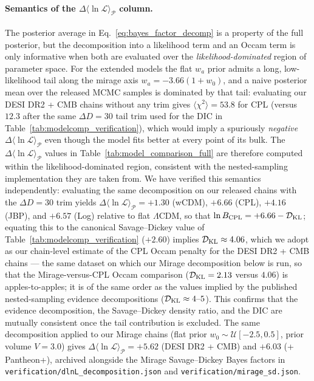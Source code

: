 \documentclass[11pt,letterpaper]{article}
\begin{document}
\paragraph{Semantics of the $\Delta \langle \ln \mathcal{L} \rangle_{\mathcal{P}}$ column.} The posterior average in Eq.~\ref{eq:bayes_factor_decomp} is a property of the full posterior, but the decomposition into a likelihood term and an Occam term is only informative when both are evaluated over the \emph{likelihood-dominated} region of parameter space. For the extended models the flat $w_a$ prior admits a long, low-likelihood tail along the mirage axis $w_a = -3.66(1+w_0)$, and a naive posterior mean over the released MCMC samples is dominated by that tail: evaluating our DESI DR2 + CMB chains without any trim gives $\langle \chi^2 \rangle = 53.8$ for CPL (versus $12.3$ after the same $\Delta D = 30$ tail trim used for the DIC in Table~\ref{tab:modelcomp_verification}), which would imply a spuriously \emph{negative} $\Delta \langle \ln \mathcal{L} \rangle_{\mathcal{P}}$ even though the model fits better at every point of its bulk. The $\Delta \langle \ln \mathcal{L} \rangle_{\mathcal{P}}$ values in Table~\ref{tab:model_comparison_full} are therefore computed within the likelihood-dominated region, consistent with the nested-sampling implementation they are taken from. We have verified this semantics independently: evaluating the same decomposition on our released chains with the $\Delta D = 30$ trim yields $\Delta \langle \ln \mathcal{L} \rangle_{\mathcal{P}} = +1.30$ (wCDM), $+6.66$ (CPL), $+4.16$ (JBP), and $+6.57$ (Log) relative to flat $\Lambda$CDM, so that $\ln B_{\rm CPL} = +6.66 - \mathcal{D}_{\rm KL}$; equating this to the canonical Savage--Dickey value of Table~\ref{tab:modelcomp_verification} ($+2.60$) implies $\mathcal{D}_{\rm KL} \approx 4.06$, which we adopt as our chain-level estimate of the CPL Occam penalty for the DESI DR2 + CMB chains --- the same dataset on which our Mirage decomposition below is run, so that the Mirage-versus-CPL Occam comparison ($\mathcal{D}_{\rm KL} = 2.13$ versus $4.06$) is apples-to-apples; it is of the same order as the values implied by the published nested-sampling evidence decompositions ($\mathcal{D}_{\rm KL} \approx 4\text{--}5$). This confirms that the evidence decomposition, the Savage--Dickey density ratio, and the DIC are mutually consistent once the tail contribution is excluded. The same decomposition applied to our Mirage chains (flat prior $w_0 \sim \mathcal{U}[-2.5, 0.5]$, prior volume $V = 3.0$) gives $\Delta\langle\ln\mathcal{L}\rangle_{\mathcal{P}} = +5.62$ (DESI DR2 + CMB) and $+6.03$ (+ Pantheon+), archived alongside the Mirage Savage--Dickey Bayes factors in \texttt{verification/dlnL\_decomposition.json} and \texttt{verification/mirage\_sd.json}.
\end{document}
